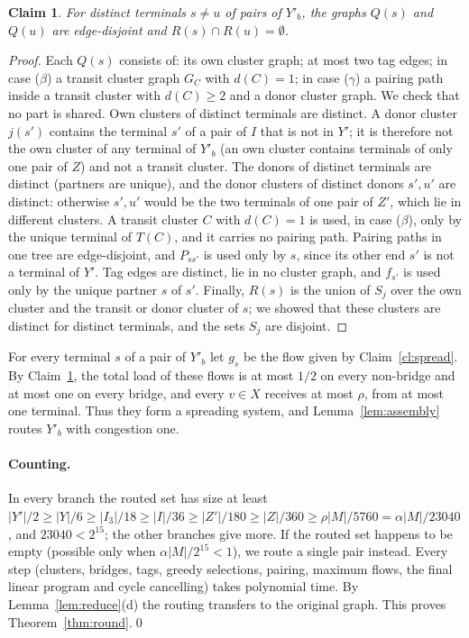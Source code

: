 \documentclass[11pt,letterpaper]{article}
\newtheorem{claim}{Claim}
\theoremstyle{definition}
\begin{document}
\begin{claim}\label{cl:disjoint}
For distinct terminals $s\ne u$ of pairs of $Y'_b$, the graphs $Q(s)$ and $Q(u)$ are
edge-disjoint and $R(s)\cap R(u)=\emptyset$.
\end{claim}
\begin{proof}
Each $Q(s)$ consists of: its own cluster graph; at most two tag edges; in case ($\beta$) a
transit cluster graph $G_C$ with $d(C)=1$; in case ($\gamma$) a pairing path inside a transit
cluster with $d(C)\ge2$ and a donor cluster graph. We check that no part is shared. Own clusters
of distinct terminals are distinct. A donor cluster $j(s')$ contains the terminal $s'$ of a
pair of $I$ that is not in $Y'$; it is therefore not the own cluster of any terminal of $Y'_b$
(an own cluster contains terminals of only one pair of $Z$) and not a transit cluster. The
donors of distinct terminals are distinct (partners are unique), and the donor clusters of
distinct donors $s',u'$ are distinct: otherwise $s',u'$ would be the two terminals of one pair
of $Z'$, which lie in different clusters. A transit cluster $C$ with $d(C)=1$ is used, in case
($\beta$), only by the unique terminal of $T(C)$, and it carries no pairing path. Pairing
paths in one tree are edge-disjoint, and $P_{ss'}$ is used only by $s$, since its other end
$s'$ is not a terminal of $Y'$. Tag edges are distinct, lie in no cluster graph, and $f_{s'}$
is used only by the unique partner $s$ of $s'$. Finally, $R(s)$ is the union of $S_j$ over the
own cluster and the transit or donor cluster of $s$; we showed that these clusters are
distinct for distinct terminals, and the sets $S_j$ are disjoint.
\end{proof}

For every terminal $s$ of a pair of $Y'_b$ let $g_s$ be the flow given by
Claim~\ref{cl:spread}. By Claim~\ref{cl:disjoint}, the total load of these flows is at most
$1/2$ on every non-bridge and at most one on every bridge, and every $v\in X$ receives at
most $\rho$, from at most one terminal. Thus they form a spreading system, and
Lemma~\ref{lem:assembly} routes $Y'_b$ with congestion one.

\paragraph{Counting.}
In every branch the routed set has size at least
$|Y'|/2\ge|Y|/6\ge|I_3|/18\ge|I|/36\ge|Z'|/180\ge|Z|/360\ge\rho|M|/5760=\alpha|M|/23040$,
and $23040<2^{15}$; the other branches give more. If the routed set happens to be empty
(possible only when $\alpha|M|/2^{15}<1$), we route a single pair instead. Every step (clusters, bridges, tags, greedy
selections, pairing, maximum flows, the final linear program and cycle cancelling) takes
polynomial time. By Lemma~\ref{lem:reduce}(d) the routing transfers to the original graph.
This proves Theorem~\ref{thm:round}.\qed
\end{document}
